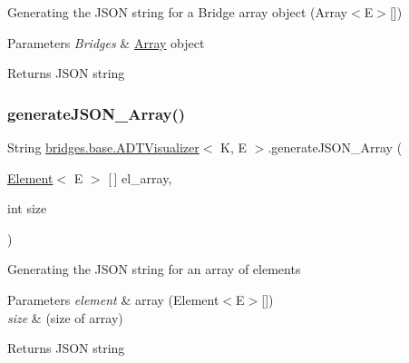 Generating the J\+S\+ON string for a Bridge array object (Array$<$\+E$>$\mbox{[}\mbox{]})


\begin{DoxyParams}{Parameters}
{\em Bridges} & \hyperlink{classbridges_1_1base_1_1_array}{Array} object\\
\hline
\end{DoxyParams}
\begin{DoxyReturn}{Returns}
J\+S\+ON string 
\end{DoxyReturn}
\hypertarget{classbridges_1_1base_1_1_a_d_t_visualizer_a309d4f0521b66bb1329c0362f1ca5d33}{}\label{classbridges_1_1base_1_1_a_d_t_visualizer_a309d4f0521b66bb1329c0362f1ca5d33} 
\subsubsection{\texorpdfstring{generate\+J\+S\+O\+N\+\_\+\+Array()}{generateJSON\_Array()}\hspace{0.1cm}{\footnotesize\ttfamily [2/2]}}
{\footnotesize\ttfamily String \hyperlink{classbridges_1_1base_1_1_a_d_t_visualizer}{bridges.\+base.\+A\+D\+T\+Visualizer}$<$ K, E $>$.generate\+J\+S\+O\+N\+\_\+\+Array (\begin{DoxyParamCaption}\item[{\hyperlink{classbridges_1_1base_1_1_element}{Element}$<$ E $>$ \mbox{[}$\,$\mbox{]}}]{el\+\_\+array,  }\item[{int}]{size }\end{DoxyParamCaption})}

Generating the J\+S\+ON string for an array of elements


\begin{DoxyParams}{Parameters}
{\em element} & array (Element$<$\+E$>$\mbox{[}\mbox{]}) \\
\hline
{\em size} & (size of array)\\
\hline
\end{DoxyParams}
\begin{DoxyReturn}{Returns}
J\+S\+ON string 
\end{DoxyReturn}
\hypertarget{classbridges_1_1base_1_1_a_d_t_visualizer_a866df531965d152d5686304f07e15a4a}{}\label{classbridges_1_1base_1_1_a_d_t_visualizer_a866df531965d152d5686304f07e15a4a} 
